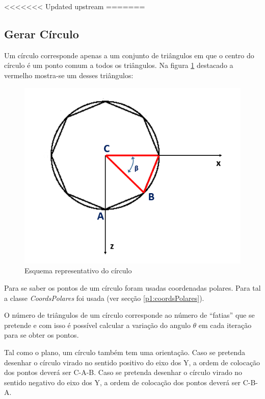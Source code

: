<<<<<<< Updated upstream
=======
\newpage
\subsection{Gerar Círculo}
\label{p3:circulo}

Um círculo corresponde apenas a um conjunto de triângulos em que o centro do círculo é um ponto comum a todos os triângulos. Na figura \ref{p1:fig:p3_circulo} destacado a vermelho mostra-se um desses triângulos:

\begin{figure}[htpb]
	\centering
	\includegraphics[scale=0.5]{imagens/p3_circulo.png}
	\caption{Esquema representativo do círculo}
	\label{p1:fig:p3_circulo}
\end{figure}

Para se saber os pontos de um círculo foram usadas coordenadas polares. Para tal a classe \textit{CoordsPolares} foi usada (ver secção \ref{p1:coordsPolares}).

O número de triângulos de um círculo corresponde ao número de ``fatias'' que se pretende e com isso é possível calcular a variação do angulo $\theta$ em cada iteração para se obter os pontos.

Tal como o plano, um círculo também tem uma orientação. Caso se pretenda desenhar o círculo virado no sentido positivo do eixo dos Y, a ordem de colocação dos pontos deverá ser C-A-B. Caso se pretenda desenhar o círculo virado no sentido negativo do eixo dos Y, a ordem de colocação dos pontos deverá ser C-B-A.

